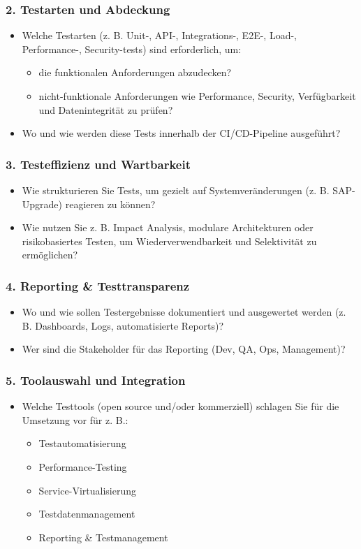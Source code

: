 \subsubsection{2. Testarten und Abdeckung}
\begin{itemize}
    \item Welche Testarten (z. B. Unit-, API-, Integrations-, E2E-, Load-, Performance-, Security-tests) sind erforderlich, um:
    \begin{itemize}
        \item die funktionalen Anforderungen abzudecken?
        \item nicht-funktionale Anforderungen wie Performance, Security, Verfügbarkeit und Datenintegrität zu prüfen?
    \end{itemize}
    \item Wo und wie werden diese Tests innerhalb der CI/CD-Pipeline ausgeführt?
\end{itemize}

\subsubsection{3. Testeffizienz und Wartbarkeit}
\begin{itemize}
    \item Wie strukturieren Sie Tests, um gezielt auf Systemveränderungen (z. B. SAP-Upgrade) reagieren zu können?
    \item Wie nutzen Sie z. B. Impact Analysis, modulare Architekturen oder risikobasiertes Testen, um Wiederverwendbarkeit und Selektivität zu ermöglichen?
\end{itemize}

\subsubsection{4. Reporting \& Testtransparenz}
\begin{itemize}
    \item Wo und wie sollen Testergebnisse dokumentiert und ausgewertet werden (z. B. Dashboards, Logs, automatisierte Reports)?
    \item Wer sind die Stakeholder für das Reporting (Dev, QA, Ops, Management)?
\end{itemize}

\subsubsection{5. Toolauswahl und Integration}
\begin{itemize}
    \item Welche Testtools (open source und/oder kommerziell) schlagen Sie für die Umsetzung vor für z. B.:
    \begin{itemize}
        \item Testautomatisierung
        \item Performance-Testing
        \item Service-Virtualisierung
        \item Testdatenmanagement
        \item Reporting \& Testmanagement
    \end{itemize}
\end{itemize}

